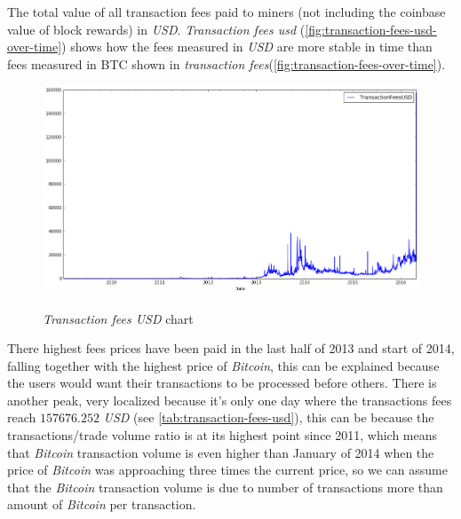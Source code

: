 The total value of all transaction fees paid to miners (not including
the coinbase value of block rewards) in \textit{USD}.
\textit{Transaction fees usd}
(\autoref{fig:transaction-fees-usd-over-time}) shows how the fees
measured in \textit{USD} are more stable in time than fees measured in
BTC shown in \textit{transaction
fees}(\autoref{fig:transaction-fees-over-time}).

\begin{figure}[bth]
  \myfloatalign
  {\includegraphics[width=1\linewidth]
    {gfx/transaction-fees-usd-over-time}}
  \caption{\textit{Transaction fees USD} chart}
  \label{fig:transaction-fees-usd-over-time}
\end{figure}

There highest fees prices have been paid in the last half of 2013 and
start of 2014, falling together with the highest price of
\textit{Bitcoin}, this can be explained because the users would want
their transactions to be processed before others. There is another
peak, very localized because it's only one day where the transactions
fees reach $157676.252$ \textit{USD} (see
\autoref{tab:transaction-fees-usd}), this can be because the
transactions/trade volume ratio is at its highest point since 2011,
which means that \textit{Bitcoin} transaction volume is even higher
than January of 2014 when the price of \textit{Bitcoin} was
approaching three times the current price, so we can assume that the
\textit{Bitcoin} transaction volume is due to number of transactions
more than amount of \textit{Bitcoin} per transaction.

